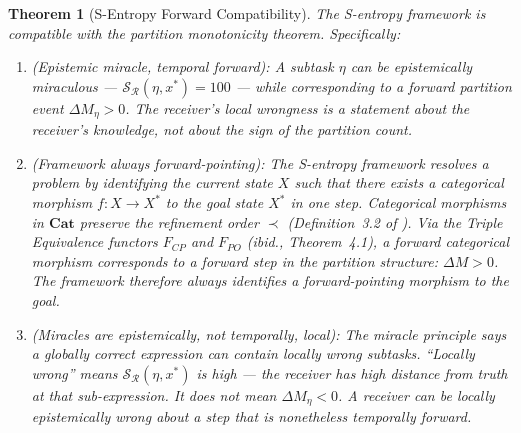 \documentclass[twocolumn,10pt,a4paper]{article}
\theoremstyle{thmstyle}
\newtheorem{theorem}{Theorem}[section]
\theoremstyle{definition}
\theoremstyle{remark}
\begin{document}
\begin{theorem}[S-Entropy Forward Compatibility]
\label{thm:s-entropy-compat}
The S-entropy framework is compatible with the partition monotonicity theorem. Specifically:
\begin{enumerate}[leftmargin=1.5em,label=(\roman*),itemsep=0.2em]
\item \emph{(Epistemic miracle, temporal forward):} A subtask $\eta$ can be epistemically miraculous --- $\mathcal{S}_{\mathcal{R}}(\eta, x^{*}) = 100$ --- while corresponding to a forward partition event $\Delta M_{\eta} > 0$. The receiver's local wrongness is a statement about the receiver's knowledge, not about the sign of the partition count.
\item \emph{(Framework always forward-pointing):} The S-entropy framework resolves a problem by identifying the current state $X$ such that there exists a categorical morphism $f : X \to X^{*}$ to the goal state $X^{*}$ in one step. Categorical morphisms in $\mathbf{Cat}$ preserve the refinement order $\prec$ (Definition~3.2 of \citealp{sachikonye2024sentropy}). Via the Triple Equivalence functors $F_{CP}$ and $F_{PO}$ (\textit{ibid.}, Theorem~4.1), a forward categorical morphism corresponds to a forward step in the partition structure: $\Delta M > 0$. The framework therefore always identifies a forward-pointing morphism to the goal.
\item \emph{(Miracles are epistemically, not temporally, local):} The miracle principle says a globally correct expression can contain locally wrong subtasks. ``Locally wrong'' means $\mathcal{S}_{\mathcal{R}}(\eta, x^{*})$ is high --- the receiver has high distance from truth at that sub-expression. It does not mean $\Delta M_{\eta} < 0$. A receiver can be locally epistemically wrong about a step that is nonetheless temporally forward.
\end{enumerate}
\end{theorem}
\end{document}
